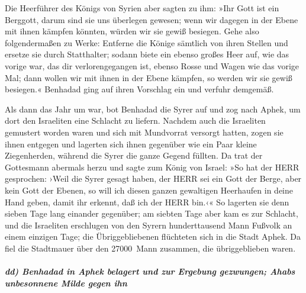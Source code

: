Die Heerführer des Königs von Syrien aber sagten zu ihm:
»Ihr Gott ist ein Berggott, darum sind sie uns überlegen gewesen; wenn
wir dagegen in der Ebene mit ihnen kämpfen könnten, würden wir sie gewiß
besiegen. Gehe also folgendermaßen zu Werke: Entferne die
Könige sämtlich von ihren Stellen und ersetze sie durch Statthalter;
sodann biete ein ebenso großes Heer auf, wie das vorige
war, das dir verlorengegangen ist, ebenso Rosse und Wagen wie das vorige
Mal; dann wollen wir mit ihnen in der Ebene kämpfen, so werden wir sie
gewiß besiegen.« Benhadad ging auf ihren Vorschlag ein und verfuhr
demgemäß.

Als dann das Jahr um war, bot Benhadad die Syrer auf und
zog nach Aphek, um dort den Israeliten eine Schlacht zu liefern.
Nachdem auch die Israeliten gemustert worden waren und
sich mit Mundvorrat versorgt hatten, zogen sie ihnen entgegen und
lagerten sich ihnen gegenüber wie ein Paar kleine Ziegenherden, während
die Syrer die ganze Gegend füllten. Da trat der
Gottesmann abermals herzu und sagte zum König von Israel: »So hat der
HERR gesprochen: ›Weil die Syrer gesagt haben, der HERR sei ein Gott der
Berge, aber kein Gott der Ebenen, so will ich diesen ganzen gewaltigen
Heerhaufen in deine Hand geben, damit ihr erkennt, daß ich der HERR
bin.‹« So lagerten sie denn sieben Tage lang einander
gegenüber; am siebten Tage aber kam es zur Schlacht, und die Israeliten
erschlugen von den Syrern hunderttausend Mann Fußvolk an einem einzigen
Tage; die Übriggebliebenen flüchteten sich in die Stadt
Aphek. Da fiel die Stadtmauer über den 27000~Mann zusammen, die
übriggeblieben waren.

\hypertarget{dd-benhadad-in-aphek-belagert-und-zur-ergebung-gezwungen-ahabs-unbesonnene-milde-gegen-ihn}{%
\subparagraph{dd) Benhadad in Aphek belagert und zur Ergebung gezwungen;
Ahabs unbesonnene Milde gegen
ihn}\label{dd-benhadad-in-aphek-belagert-und-zur-ergebung-gezwungen-ahabs-unbesonnene-milde-gegen-ihn}}

